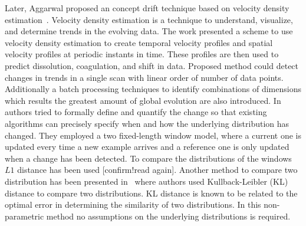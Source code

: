 Later, Aggarwal proposed an concept drift technique based on velocity density estimation~\cite{aggarwal03:condrift}. Velocity density estimation is a technique to understand, visualize, and determine trends in the evolving data. The work presented a scheme to use velocity density estimation to create temporal velocity profiles and spatial velocity profiles at periodic instants in time. These profiles are then used to predict dissolution, coagulation, and shift in data. Proposed method could detect changes in trends in a single scan with linear order of number of data points. Additionally a batch processing techniques to identify combinations of dimensions which results the greatest amount of global evolution are also introduced. In~\cite{kifer04:condrift} authors tried to formally define and quantify the change so that existing algorithms can precisely specify when and how the underlying distribution has changed. They employed a two fixed-length window model, where a current one is updated every time a new example arrives and a reference one is only updated when a change has been detected. To compare the distributions of the windows $L1$ distance has been used [confirm!read again]. Another method to compare two distribution has been presented in~\cite{dasu05:condrift} where authors used Kullback-Leibler (KL) distance to compare two distributions. KL distance is known to be related to the optimal error in determining the similarity of two distributions. In this non-parametric method no assumptions on the underlying distributions is required. 


